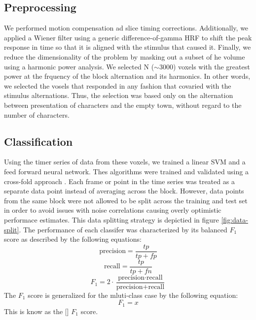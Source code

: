 \documentclass[twocolumn,draft]{article}
\begin{document}
\subsection{Preprocessing}
We performed motion compensation ad slice timing corrections. 
Additionally, we applied a Wiener filter using a generic difference-of-gamma HRF \cite{Boynton1996} to shift the peak response in time so that it is aligned with the stimulus that caused it.
Finally, we reduce the dimensionality of the problem by masking out a subset of he volume using a harmonic power analysis.
We selected N ($\sim$3000) voxels with the greatest power at the frquency of the block alternation and its harmonics.
In other words, we selected the vosels that responded in any fashion that covaried with the stimulus alternations.
Thus, the selection was based only on the alternation between presentation of characters and the empty town, without regard to the number of characters.

\subsection{Classification}
Using the timer series of data from these voxels, we trained a linear SVM and a feed forward neural network.
Thes algorithms were trained and validated using a cross-fold approach \cite{Kohavi1995}.
Each frame or point in the time series was treated as a separate data point instead of averaging across the block.
However, data points from the same block were not allowed to be split across the training and test set in order to avoid issues with noise correlations causing overly optimistic performace estimates.
This data splitting strategy is depictied in figure \ref{fig:data-split}.
The performance of each classifer was characterized by its balanced $F_1$ score as described by the following equations:
\begin{equation}
\mbox{precision} = \frac{tp}{tp + fp}
\label{eqn:precision}
\end{equation}
\begin{equation}
\mbox{recall} = \frac{tp}{tp + fn}
\label{eqn:recall}
\end{equation}
\begin{equation}
F_1 = 2 \cdot \frac{\mbox{precision} \cdot \mbox{recall}}{\mbox{precision} + \mbox{recall}}
\label{eqn:f1}
\end{equation}
The $F_1$ score is generalized for the mluti-class case by the following equation:
\begin{equation}
F_1 = x
\label{eqn:f1-multi}
\end{equation}
This is know as the  [] $F_1$ score.
\end{document}
